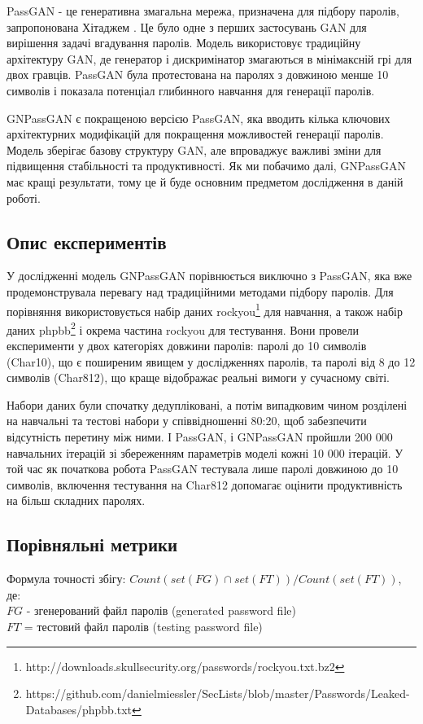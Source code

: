 PassGAN - це генеративна змагальна мережа, призначена для підбору паролів, запропонована Хітаджем \cite{Passgan: A deep learning approach for password guessing}. Це було одне з перших застосувань GAN для вирішення задачі вгадування паролів. Модель використовує традиційну архітектуру GAN, де генератор і дискримінатор змагаються в мінімаксній грі для двох гравців. PassGAN була протестована на паролях з довжиною менше 10 символів і показала потенціал глибинного навчання для генерації паролів.

GNPassGAN є покращеною версією PassGAN, яка вводить кілька ключових архітектурних модифікацій для покращення можливостей генерації паролів. Модель зберігає базову структуру GAN, але впроваджує важливі зміни для підвищення стабільності та продуктивності. Як ми побачимо далі, GNPassGAN має кращі результати, тому це й буде основним предметом дослідження в даній роботі. 

\subsection{Опис експериментів}
У дослідженні \cite{GNPassGAN: Improved Generative Adversarial Networks For Trawling Offline Password Guessing} модель GNPassGAN порівнюється виключно з PassGAN, яка вже продемонструвала перевагу над традиційними методами підбору паролів. Для порівняння використовується набір даних rockyou\footnote{http://downloads.skullsecurity.org/passwords/rockyou.txt.bz2} для навчання, а також набір даних phpbb\footnote{https://github.com/danielmiessler/SecLists/blob/master/Passwords/Leaked-Databases/phpbb.txt} і окрема частина rockyou  для тестування. Вони провели експерименти у двох категоріях довжини паролів: паролі до 10 символів (Char10), що є поширеним явищем у дослідженнях паролів, та паролі від 8 до 12 символів (Char812), що краще відображає реальні вимоги у сучасному світі.

Набори даних були спочатку дедупліковані, а потім випадковим чином розділені на навчальні та тестові набори у співвідношенні 80:20, щоб забезпечити відсутність перетину між ними. І PassGAN, і GNPassGAN пройшли 200 000 навчальних ітерацій зі збереженням параметрів моделі кожні 10 000 ітерацій. У той час як початкова робота PassGAN \cite{Passgan: A deep learning approach for password guessing} тестувала лише паролі довжиною до 10 символів, включення тестування на Char812 допомагає оцінити продуктивність на більш складних паролях.

\subsection{Порівняльні метрики}
Формула точності збігу: \(Count(set(FG) \cap set(FT)) / Count(set(FT))\), де: \\
    \(FG\) - згенерований файл паролів (generated password file) \\
    \(FT\) = тестовий файл паролів (testing password file) \\ 

